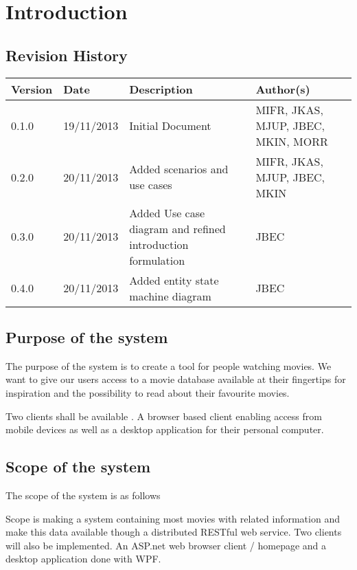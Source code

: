 \chapter{Introduction}
\label{sec:introduction}

\section{Revision History}
\begin{center}
    \begin{tabular}{ | l | l | p{6cm} | p{4cm} |}
    \hline
    Version & Date & Description & Author(s) \\ \hline
    0.1.0 & 19/11/2013 & Initial Document & MIFR, JKAS, MJUP, JBEC, MKIN, MORR
    \\ \hline
    0.2.0 & 20/11/2013 & Added scenarios and use cases & MIFR, JKAS, MJUP, JBEC, MKIN
    \\ \hline
    0.3.0 & 20/11/2013 & Added Use case diagram and refined introduction formulation & JBEC
    \\ \hline
    0.4.0 & 20/11/2013 & Added entity state machine diagram & JBEC
    \\ \hline
    \end{tabular}
\end{center}

\section{Purpose of the system}

The purpose of the system is to create a tool for people watching movies. We want to give our users access to a movie database available at their fingertips for inspiration and the possibility to read about their favourite movies.

Two clients shall be available . A browser based client enabling access from mobile devices as well as a desktop application for their personal computer.  




\section{Scope of the system}

The scope of the system is as follows

Scope is making a system containing most movies with related information and make this data available though a distributed RESTful web service. Two clients will also be implemented. An ASP.net web browser client / homepage and a desktop application done with WPF.

